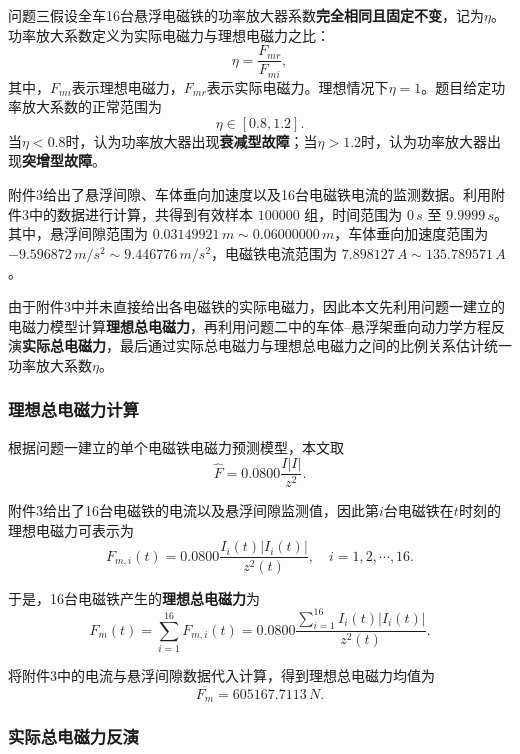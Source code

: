 \documentclass[a4paper]{nmmcm}
\begin{document}
问题三假设全车16台悬浮电磁铁的功率放大器系数\textbf{完全相同且固定不变}，记为$\eta$。功率放大系数定义为实际电磁力与理想电磁力之比：
\begin{equation}
\eta=\frac{F_{mr}}{F_{mi}},
\end{equation}
其中，$F_{mi}$表示理想电磁力，$F_{mr}$表示实际电磁力。理想情况下$\eta=1$。题目给定功率放大系数的正常范围为
\begin{equation}
\eta\in[0.8,1.2].
\end{equation}
当$\eta<0.8$时，认为功率放大器出现\textbf{衰减型故障}；当$\eta>1.2$时，认为功率放大器出现\textbf{突增型故障}。

附件3给出了悬浮间隙、车体垂向加速度以及16台电磁铁电流的监测数据。利用附件3中的数据进行计算，共得到有效样本 $100000$ 组，时间范围为 $0\,s$ 至 $9.9999\,s$。其中，悬浮间隙范围为 $0.03149921\,m \sim 0.06000000\,m$，车体垂向加速度范围为 $-9.596872\,m/s^2 \sim 9.446776\,m/s^2$，电磁铁电流范围为 $7.898127\,A \sim 135.789571\,A$。

由于附件3中并未直接给出各电磁铁的实际电磁力，因此本文先利用问题一建立的电磁力模型计算\textbf{理想总电磁力}，再利用问题二中的车体--悬浮架垂向动力学方程反演\textbf{实际总电磁力}，最后通过实际总电磁力与理想总电磁力之间的比例关系估计统一功率放大系数$\eta$。

\subsubsection{理想总电磁力计算}

根据问题一建立的单个电磁铁电磁力预测模型，本文取
\begin{equation}
\hat{F}=0.0800\frac{I|I|}{z^2}.
\end{equation}

附件3给出了16台电磁铁的电流以及悬浮间隙监测值，因此第$i$台电磁铁在$t$时刻的理想电磁力可表示为
\begin{equation}
F_{m,i}(t)=0.0800\frac{I_i(t)|I_i(t)|}{z^2(t)},
\quad i=1,2,\cdots,16.
\end{equation}

于是，16台电磁铁产生的\textbf{理想总电磁力}为
\begin{equation}
F_m(t)=\sum_{i=1}^{16}F_{m,i}(t)
=0.0800\frac{\sum_{i=1}^{16}I_i(t)|I_i(t)|}{z^2(t)}.
\end{equation}

将附件3中的电流与悬浮间隙数据代入计算，得到理想总电磁力均值为
\[
\overline{F_m}=605167.7113\,N.
\]

\subsubsection{实际总电磁力反演}
\end{document}
